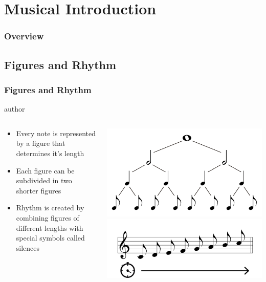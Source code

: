 \documentclass[english,handout]{beamer}
\begin{document}
\section{Musical Introduction}
\begin{frame}
	\frametitle{Overview}
\end{frame}
\subsection{Figures and Rhythm}
	\begin{frame}
		\frametitle{Figures and Rhythm}
		\begin{beamercolorbox}[leftskip=8cm,center,wd=0.7\textwidth]{author}
		\begin{columns}[T]
		\begin{column}{.60\textwidth}%
		\begin{itemize}
			\item Every note is represented by a \alert{figure} that determines it's \alert{length}
			\item Each figure can be \alert{subdivided in two} shorter figures
			\item \alert{Rhythm} is created by \alert{combining figures} of different lengths with special symbols called silences
		\end{itemize}
		\end{column}
		\begin{column}{.39\textwidth}%
		\includegraphics[width=\linewidth]{imagenes/music_tree.pdf} \\
		\includegraphics[width=\linewidth]{imagenes/C_scale_time.png}
		\end{column}
		\end{columns}
		\end{beamercolorbox}
		
	\end{frame}
\end{document}

